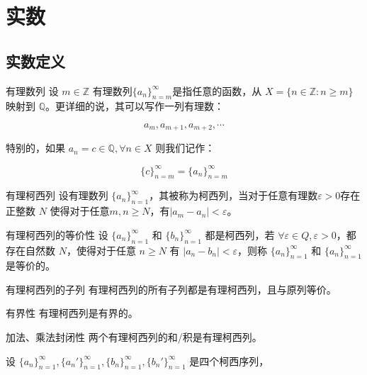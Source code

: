 \section{实数}

\subsection{实数定义}

\begin{definition}{有理数列}{}
	设 $m\in \mathbb Z$ 有理数列$\{a_n\}_{n=m}^\infty$是指任意的函数，从 $X=\{n\in \mathbb Z:n\ge m\}$ 映射到 $\mathbb Q$。更详细的说，其可以写作一列有理数：
	
	$$
	a_m,a_{m+1},a_{m+2},\cdots
	$$
\end{definition}

\begin{note}
    特别的，如果 $a_n=c\in \mathbb Q,\forall n\in X$ 则我们记作：

$$
\{c\}_{n=m}^\infty = \{a_n\}_{n=m}^\infty
$$

\end{note}

\begin{definition}{有理柯西列}{}
	设有理数列 $\{a_n\}_{n=1}^\infty$，其被称为柯西列，当对于任意有理数$\varepsilon>0$存在正整数 $N$ 使得对于任意$m,n\ge N$，有$|a_m-a_n|< \varepsilon$。
\end{definition}

\begin{definition}{有理柯西列的等价性}{}
	设 $\{a_n\}_{n=1}^\infty$ 和 $\{b_n\}_{n=1}^\infty$ 都是柯西列，若 $\forall \varepsilon \in Q,\varepsilon > 0$，都存在自然数 $N$，使得对于任意 $n\ge N$ 有 $|a_n-b_n|< \varepsilon$，则称 $\{a_n\}_{n=1}^\infty$ 和 $\{a_n\}_{n=1}^\infty$ 是等价的。
\end{definition}

\begin{lemma}{有理柯西列的子列}{}
	有理柯西列的所有子列都是有理柯西列，且与原列等价。
\end{lemma}

\begin{lemma}{有界性}{}
	有理柯西列是有界的。
\end{lemma}

\begin{lemma}{加法、乘法封闭性}{}
	两个有理柯西列的和/积是有理柯西列。
\end{lemma}

\begin{lemma}{}{}
	设 $\{a_n\}^\infty_{n=1},\{a_n'\}^\infty_{n=1},\{b_n\}^\infty_{n=1},\{b_n'\}^\infty_{n=1}$ 是四个柯西序列，
\end{lemma}

